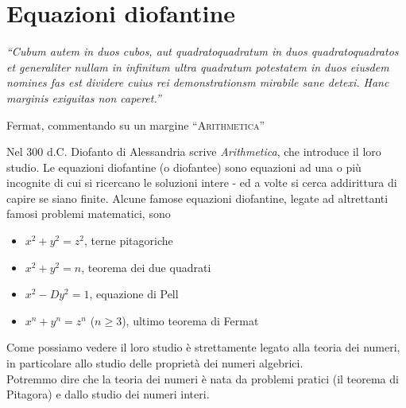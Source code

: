 \section{Equazioni diofantine}
\label{lezione16}
\epigraph{\textit{\enquote{Cubum autem in duos cubos, aut quadratoquadratum in duos quadratoquadratos et generaliter nullam in infinitum ultra quadratum potestatem in duos eiusdem nomines fas est dividere cuius rei demonstrationsm mirabile sane detexi. Hanc marginis exiguitas non caperet.}}}{Fermat, commentando su un margine \enquote{\textsc{Arithmetica}}}
Nel 300 d.C. Diofanto di Alessandria scrive \textit{Arithmetica}, che introduce il loro studio. Le equazioni diofantine (o diofantee) sono equazioni ad una o più incognite di cui si ricercano le soluzioni intere - ed a volte si cerca addirittura di capire se siano finite. Alcune famose equazioni diofantine, legate ad altrettanti famosi problemi matematici, sono
\begin{itemize}
	\item $x^2+y^2=z^2$, terne pitagoriche
	\item $x^2+y^2=n$, teorema dei due quadrati
	\item $x^2-Dy^2=1$, equazione di Pell
	\item $x^n+y^n=z^n$ ($n\geq3$), ultimo teorema di Fermat
\end{itemize}
Come possiamo vedere il loro studio è strettamente legato alla teoria dei numeri, in particolare allo studio delle {proprietà dei numeri algebrici}. \\ Potremmo dire che la teoria dei numeri è nata da problemi pratici (il teorema di Pitagora) e dallo studio dei numeri interi.
